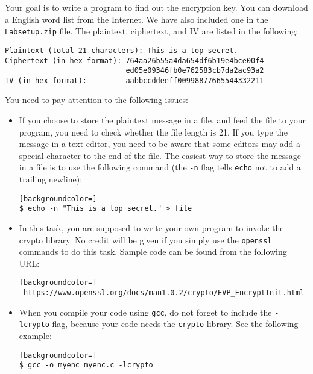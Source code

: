 Your goal is to write a program to 
find out the encryption key. You can download a English word list 
from the Internet.  We have also included one in
the \texttt{Labsetup.zip} file.  
The plaintext, ciphertext, and IV are listed in the following:


\begin{lstlisting}
Plaintext (total 21 characters): This is a top secret.
Ciphertext (in hex format): 764aa26b55a4da654df6b19e4bce00f4  
                            ed05e09346fb0e762583cb7da2ac93a2 
IV (in hex format):         aabbccddeeff00998877665544332211
\end{lstlisting}



You need to pay attention to the following issues: 

\begin{itemize} 
\item If you choose to store the plaintext message in 
a file, and feed the file to your program, you need to check
whether the file length is 21. If you type the message in a text editor,
you need to be aware that some editors may add a special
character to the end of the file. The easiest way to store the message
in a file is to use the following 
command (the \texttt{-n} flag
tells \texttt{echo} not to  add a trailing newline):


\begin{lstlisting}[backgroundcolor=]
$ echo -n "This is a top secret." > file
\end{lstlisting}
 
\item In this task, you are supposed to write your own program 
to invoke the crypto library. No credit will be given 
if you simply use the {\tt openssl} commands to do this task. 
Sample code can be found from the following URL:
\begin{lstlisting}[backgroundcolor=]
 https://www.openssl.org/docs/man1.0.2/crypto/EVP_EncryptInit.html
\end{lstlisting}


\item When you compile your code using  \texttt{gcc},
do not forget to include the \texttt{-lcrypto} flag, because your code 
needs the \texttt{crypto} library. See the following example: 

\begin{lstlisting}[backgroundcolor=]
$ gcc -o myenc myenc.c -lcrypto 
\end{lstlisting}

\end{itemize} 

